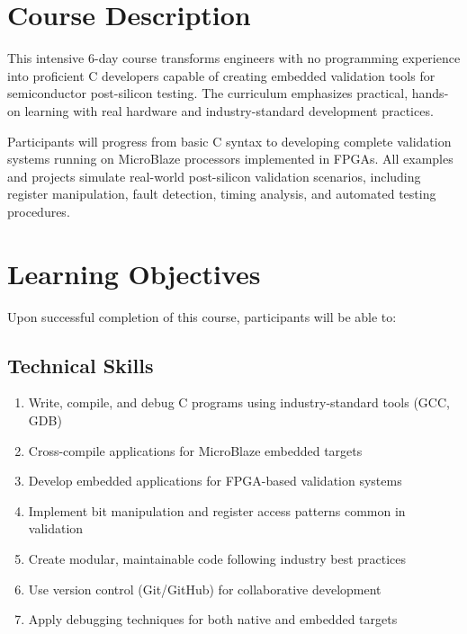 \documentclass[11pt,a4paper]{article}
\begin{document}
\section{Course Description}

This intensive 6-day course transforms engineers with no programming experience into proficient C developers capable of creating embedded validation tools for semiconductor post-silicon testing. The curriculum emphasizes practical, hands-on learning with real hardware and industry-standard development practices.

Participants will progress from basic C syntax to developing complete validation systems running on MicroBlaze processors implemented in FPGAs. All examples and projects simulate real-world post-silicon validation scenarios, including register manipulation, fault detection, timing analysis, and automated testing procedures.

\section{Learning Objectives}

Upon successful completion of this course, participants will be able to:

\subsection{Technical Skills}
\begin{enumerate}
    \item Write, compile, and debug C programs using industry-standard tools (GCC, GDB)
    \item Cross-compile applications for MicroBlaze embedded targets
    \item Develop embedded applications for FPGA-based validation systems
    \item Implement bit manipulation and register access patterns common in validation
    \item Create modular, maintainable code following industry best practices
    \item Use version control (Git/GitHub) for collaborative development
    \item Apply debugging techniques for both native and embedded targets
\end{enumerate}
\end{document}
